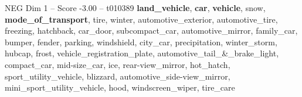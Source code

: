 \begin{textsample}{NEG Dim 1 – Score -3.00 – t010389}  \label{ex:f1_neg_031}
\textbf{land\_vehicle}, \textbf{car}, \textbf{vehicle}, snow, \textbf{mode\_of\_transport}, tire, winter, automotive\_exterior, automotive\_tire, freezing, hatchback, car\_door, subcompact\_car, automotive\_mirror, family\_car, bumper, fender, parking, windshield, city\_car, precipitation, winter\_storm, hubcap, frost, vehicle\_registration\_plate, automotive\_tail\_\&\_brake\_light, compact\_car, mid-size\_car, ice, rear-view\_mirror, hot\_hatch, sport\_utility\_vehicle, blizzard, automotive\_side-view\_mirror, mini\_sport\_utility\_vehicle, hood, windscreen\_wiper, tire\_care

\end{textsample}
